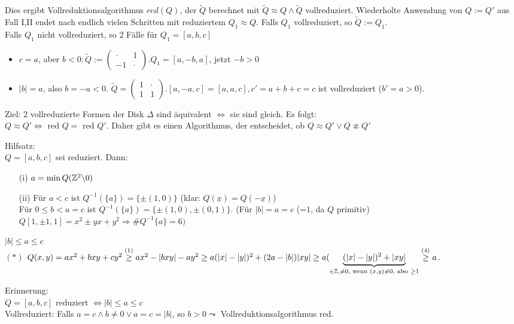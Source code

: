 \documentclass[a4paper,twoside,DIV15,BCOR12mm]{scrbook}
\begin{document}
Dies ergibt Vollreduktionsalgorithmus $red(Q)$, der $\tilde Q$ berechnet mit $\tilde Q \approx Q \wedge \tilde Q$ vollreduziert. Wiederholte Anwendung von $Q := Q'$ aus Fall I,II endet nach endlich vielen Schritten mit reduziertem $Q_1 \approx Q$. Falls $Q_1$ vollreduziert, so $\tilde Q := Q_1$.\\
Falls $Q_1$ nicht vollreduziert, so $2$ Fälle für $Q_1 = [a,b,c]$
\begin{itemize}
\item $c = a$, aber $b < 0: \tilde Q := \begin{pmatrix}\cdot & 1 \\ -1 & \cdot\end{pmatrix}.Q_1 = [a,-b,a]$, jetzt $-b > 0$
\item $|b| = a$, also $b = -a < 0$. $\tilde Q = \begin{pmatrix}1 & \cdot\\1 & 1\end{pmatrix}.[a,-a,c] = [a,a,c], c' = a+b+c = c$ ist vollreduziert ($b' = a > 0$).
\end{itemize}
Ziel: $2$ vollreduzierte Formen der Disk $\Delta$ sind äquivalent $\Leftrightarrow$ sie sind gleich. Es folgt:\\
$Q \approx Q' \Leftrightarrow \text{ red }Q = \text{ red }Q'$. Daher gibt es einen Algorithmus, der entscheidet, ob $Q \approx Q' \vee Q \not\approx Q'$

Hilfsatz:\\
$Q = [a, b, c]$ sei reduziert. Dann:
\begin{itemize}
\item[(i)] $a = \min Q(\mathbb{Z}^2 \backslash 0)$
\item[(ii)] Für $a < c$ ist $Q^{-1}(\{a\}) = \{\pm(1,0)\}$ (klar: $Q(\underline x) = Q(-\underline x)$)\\
Für $0 \le b < a = c$ ist $Q^{-1}(\{a\}) = \{\pm (1,0), \pm (0,1)\}$. (Für $|b| = a = c$ (=$1$, da $Q$ primitiv) $Q[1, \pm 1, 1] = x^2 \pm yx + y^2 \Rightarrow \# Q^{-1}\{a\} = 6)$\\
\end{itemize}
$|b| \le a \le c$\\
$(\ast)$ $Q(x,y) = ax^2 + bxy + cy^2 \stackrel{(1)}{\ge} ax^2 - |bxy| - ay^2 \ge a(|x|-|y|)^2 + (2a - |b|)|xy| \ge a(\underbrace{(|x|-|y|)^2 + |xy|}_{\in \mathbb{Z}, \not= 0, \text{ wenn } (x,y) \not= 0, \text{ also } \ge 1} \stackrel{(4)}{\ge} a$.



Erinnerung:\\
$Q = [a,b,c]$ reduziert $\Leftrightarrow |b| \le a \le c$\\
Vollreduziert: Falls $a = c \wedge b \not= 0 \vee a = c = |b|$, so $b > 0 \leadsto$ Vollreduktionsalgorithmus red.
\end{document}
